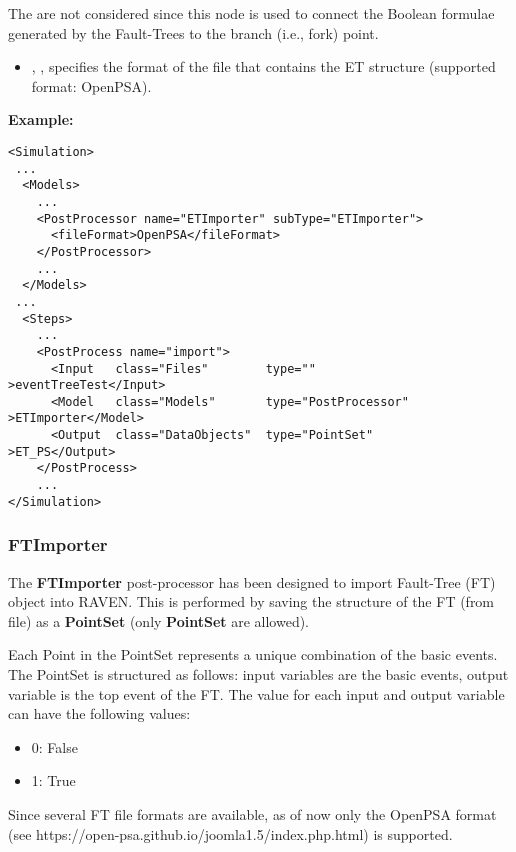 The  are not considered since this node is used to connect the Boolean formulae generated by the
Fault-Trees to the branch (i.e., fork) point.

%
%
\begin{itemize}
  \item {}, , specifies the format of the file that contains the ET structure (supported format: OpenPSA).
\end{itemize}

\textbf{Example:}

\begin{lstlisting}[style=XML]
<Simulation>
 ...
  <Models>
    ...
    <PostProcessor name="ETImporter" subType="ETImporter">
      <fileFormat>OpenPSA</fileFormat>
    </PostProcessor>   
    ...
  </Models>
 ...
  <Steps>
    ...
    <PostProcess name="import">
      <Input   class="Files"        type=""                >eventTreeTest</Input>
      <Model   class="Models"       type="PostProcessor"   >ETImporter</Model>
      <Output  class="DataObjects"  type="PointSet"        >ET_PS</Output>
    </PostProcess>
    ...
</Simulation>
\end{lstlisting}



\subsubsection{FTImporter}
\label{FTImporterPP}
The \textbf{FTImporter} post-processor has been designed to import Fault-Tree (FT) object into
RAVEN. This is performed by saving the structure of the FT (from file) as a \textbf{PointSet}
(only \textbf{PointSet} are allowed). 

Each Point in the PointSet represents a unique combination of the basic events.
The PointSet is structured as follows: input variables are the basic events, output variable is the top event of the FT.
The value for each input and output variable can have the following values:
\begin{itemize}
  \item  0: False
  \item  1: True
\end{itemize}

Since several FT file formats are available, as of now only the OpenPSA format
(see https://open-psa.github.io/joomla1.5/index.php.html) is supported.


